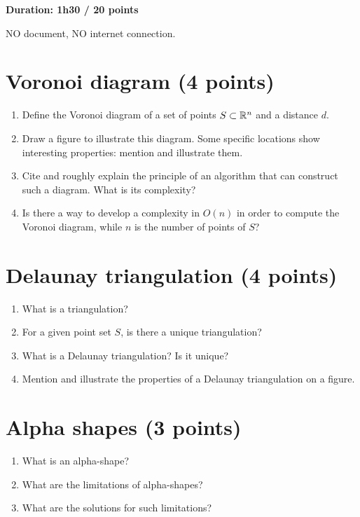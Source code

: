 

\noindent
{\bf Duration: 1h30 / 20 points}


NO document, NO internet connection.

\section{Voronoi diagram (4 points)}

\begin{qbox}
 \begin{enumerate}
  \item Define the Voronoi diagram of a set of points $S\subset\mathbb{R}^n$ and a distance $d$.
  \item Draw a figure to illustrate this diagram. Some specific locations show interesting properties: mention and illustrate them.
  \item Cite and roughly explain the principle of an algorithm that can construct such a diagram. What is its complexity?
  \item Is there a way to develop a complexity in $O(n)$ in order to compute the Voronoi diagram, while $n$ is the number of points of $S$?
  
 \end{enumerate}

\end{qbox}

\section{Delaunay triangulation (4 points)}
\begin{qbox}
\begin{enumerate}
 \item What is a triangulation?
 \item For a given point set $S$, is there a unique triangulation?
 \item What is a Delaunay triangulation? Is it unique?
 \item Mention and illustrate the properties of a Delaunay triangulation on a figure.
\end{enumerate}
\end{qbox}

\section{Alpha shapes (3 points)}
\begin{qbox}
 \begin{enumerate}
  \item What is an alpha-shape?
  \item What are the limitations of alpha-shapes?
  \item What are the solutions for such limitations?
 \end{enumerate}

\end{qbox}

